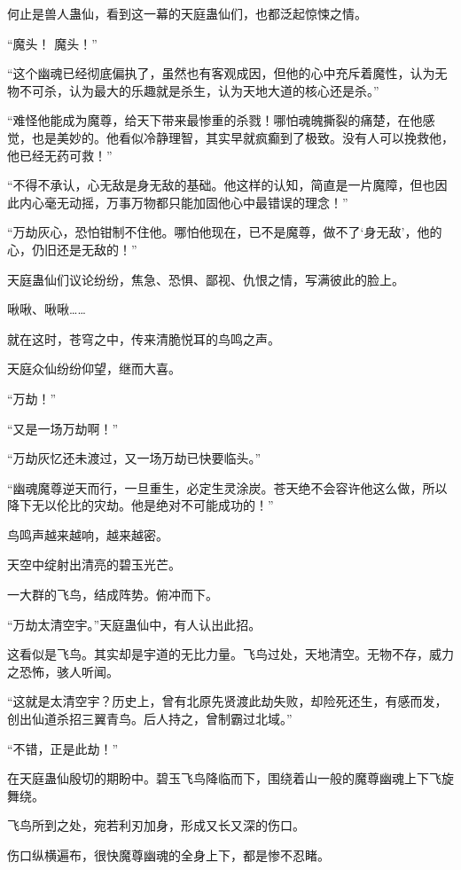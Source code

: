 
\begin{this_body}

何止是兽人蛊仙，看到这一幕的天庭蛊仙们，也都泛起惊悚之情。

“魔头！ 魔头！”

“这个幽魂已经彻底偏执了，虽然也有客观成因，但他的心中充斥着魔性，认为无物不可杀，认为最大的乐趣就是杀生，认为天地大道的核心还是杀。”

“难怪他能成为魔尊，给天下带来最惨重的杀戮！哪怕魂魄撕裂的痛楚，在他感觉，也是美妙的。他看似冷静理智，其实早就疯癫到了极致。没有人可以挽救他，他已经无药可救！”

“不得不承认，心无敌是身无敌的基础。他这样的认知，简直是一片魔障，但也因此内心毫无动摇，万事万物都只能加固他心中最错误的理念！”

“万劫灰心，恐怕钳制不住他。哪怕他现在，已不是魔尊，做不了‘身无敌’，他的心，仍旧还是无敌的！”

天庭蛊仙们议论纷纷，焦急、恐惧、鄙视、仇恨之情，写满彼此的脸上。

啾啾、啾啾……

就在这时，苍穹之中，传来清脆悦耳的鸟鸣之声。

天庭众仙纷纷仰望，继而大喜。

“万劫！”

“又是一场万劫啊！”

“万劫灰忆还未渡过，又一场万劫已快要临头。”

“幽魂魔尊逆天而行，一旦重生，必定生灵涂炭。苍天绝不会容许他这么做，所以降下无以伦比的灾劫。他是绝对不可能成功的！”

鸟鸣声越来越响，越来越密。

天空中绽射出清亮的碧玉光芒。

一大群的飞鸟，结成阵势。俯冲而下。

“万劫太清空宇。”天庭蛊仙中，有人认出此招。

这看似是飞鸟。其实却是宇道的无比力量。飞鸟过处，天地清空。无物不存，威力之恐怖，骇人听闻。

“这就是太清空宇？历史上，曾有北原先贤渡此劫失败，却险死还生，有感而发，创出仙道杀招三翼青鸟。后人持之，曾制霸过北域。”

“不错，正是此劫！”

在天庭蛊仙殷切的期盼中。碧玉飞鸟降临而下，围绕着山一般的魔尊幽魂上下飞旋舞绕。

飞鸟所到之处，宛若利刃加身，形成又长又深的伤口。

伤口纵横遍布，很快魔尊幽魂的全身上下，都是惨不忍睹。


\end{this_body}
